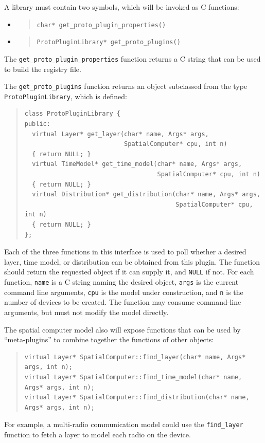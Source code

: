 \documentclass{article}
\newcommand\code[1]{\begin{quote}\var{#1}\end{quote}}
\newcommand\var[1]{{\tt #1}}
\begin{document}
A library must contain two symbols, which will be invoked as C functions:
\begin{itemize}
\item \code{char* get\_proto\_plugin\_properties()}
\item \code{ProtoPluginLibrary* get\_proto\_plugins()}
\end{itemize}

The \var{get\_proto\_plugin\_properties} function returns a C string
that can be used to build the registry file.

The \var{get\_proto\_plugins} function returns an object subclassed
from the type \var{ProtoPluginLibrary}, which is defined:
\begin{quote}
\begin{verbatim}
class ProtoPluginLibrary {
public:
  virtual Layer* get_layer(char* name, Args* args, 
                           SpatialComputer* cpu, int n)
  { return NULL; }
  virtual TimeModel* get_time_model(char* name, Args* args, 
                                    SpatialComputer* cpu, int n)
  { return NULL; }
  virtual Distribution* get_distribution(char* name, Args* args, 
                                         SpatialComputer* cpu, int n)
  { return NULL; }
};
\end{verbatim}
\end{quote}

Each of the three functions in this interface is used to poll whether
a desired layer, time model, or distribution can be obtained from this
plugin.  The function should return the requested object if it can
supply it, and \var{NULL} if not.  For each function, \var{name} is a
C string naming the desired object, \var{args} is the current command
line arguments, \var{cpu} is the model under construction, and \var{n}
is the number of devices to be created.  The function may consume
command-line arguments, but must not modify the model directly.

The spatial computer model also will expose functions that can be used
by ``meta-plugins'' to combine together the functions of other
objects:
\begin{quote}
\begin{verbatim}
virtual Layer* SpatialComputer::find_layer(char* name, Args* args, int n);
virtual Layer* SpatialComputer::find_time_model(char* name, Args* args, int n);
virtual Layer* SpatialComputer::find_distribution(char* name, Args* args, int n);
\end{verbatim}
\end{quote}
For example, a multi-radio communication model could use the
\var{find\_layer} function to fetch a layer to model each radio on the
device.
\end{document}
